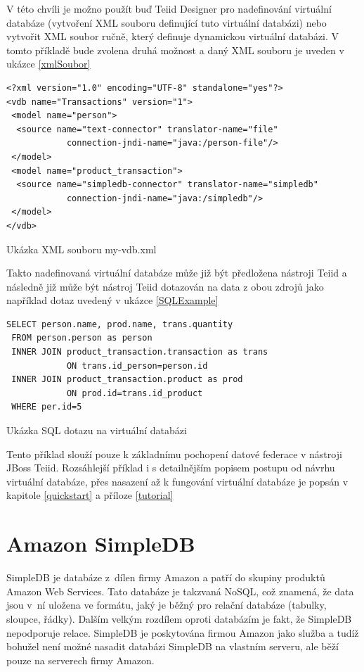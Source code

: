 \documentclass[oneside,12pt]{fithesis2}
\begin{document}
V této chvíli je možno použít buď Teiid Designer pro nadefinování virtuální databáze (vytvoření XML souboru definující tuto virtuální databázi) nebo vytvořit XML soubor ručně, který definuje dynamickou virtuální databázi. V tomto příkladě bude zvolena druhá možnost a daný XML souboru je uveden v ukázce \ref{xmlSoubor}
\begin{ukazka}[h]
\begin{Verbatim}[frame=leftline,fontsize=\small]
<?xml version="1.0" encoding="UTF-8" standalone="yes"?>
<vdb name="Transactions" version="1">
 <model name="person">
  <source name="text-connector" translator-name="file"
            connection-jndi-name="java:/person-file"/>
 </model>
 <model name="product_transaction">
  <source name="simpledb-connector" translator-name="simpledb"
            connection-jndi-name="java:/simpledb"/>
 </model>
</vdb>
\end{Verbatim}
\caption{Ukázka XML souboru my-vdb.xml}
\label{xmlSoubor}
\end{ukazka}

\vspace{150pt}
Takto nadefinovaná virtuální databáze může již být předložena nástroji Teiid a následně již může být nástroj Teiid dotazován na data z obou zdrojů jako například dotaz uvedený v ukázce \ref{SQLExample}
\begin{ukazka}[h]
\begin{Verbatim}[frame=leftline,fontsize=\small]
 SELECT person.name, prod.name, trans.quantity 
 FROM person.person as person
 INNER JOIN product_transaction.transaction as trans 
            ON trans.id_person=person.id
 INNER JOIN product_transaction.product as prod 
            ON prod.id=trans.id_product
 WHERE per.id=5
\end{Verbatim}
\caption{Ukázka SQL dotazu na virtuální databázi}
\label{SQLExample}
\end{ukazka}

Tento příklad slouží pouze k základnímu pochopení datové federace v nástroji JBoss Teiid. Rozsáhlejší příklad i s detailnějším popisem postupu od návrhu virtuální databáze, přes nasazení až k fungování virtuální databáze je popsán v kapitole \ref{quickstart} a příloze \ref{tutorial}

\chapter{Amazon SimpleDB}
SimpleDB je databáze z~dílen firmy Amazon a patří do skupiny produktů Amazon Web Services. Tato databáze je takzvaná NoSQL, což znamená, že data jsou v~ní  uložena ve formátu, jaký je běžný pro relační databáze (tabulky, sloupce, řádky). Dalším velkým rozdílem oproti  databázím je fakt, že SimpleDB nepodporuje relace. SimpleDB je poskytována firmou Amazon jako služba a tudíž bohužel není možné nasadit databázi SimpleDB na vlastním serveru, ale běží pouze na serverech firmy Amazon. 
\end{document}
